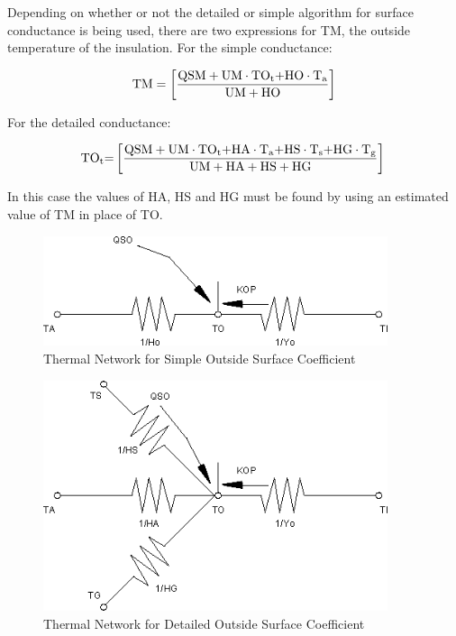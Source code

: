 Depending on whether or not the detailed or simple algorithm for surface conductance is being used, there are two expressions for TM, the outside temperature of the insulation. For the simple conductance:

\begin{equation}
{\rm{TM}} = \left[ {\frac{{{\rm{QSM + UM}}\cdot {\rm{T}}{{\rm{O}}_{\rm{t}}}{\rm{ + HO}}\cdot {{\rm{T}}_{\rm{a}}}}}{{{\rm{UM + HO}}}}} \right]
\end{equation}

For the detailed conductance:

\begin{equation}
{\rm{T}}{{\rm{O}}_{\rm{t}}}{\rm{ = }}\left[ {\frac{{{\rm{QSM}} + {\rm{UM}}\cdot {\rm{T}}{{\rm{O}}_{\rm{t}}}{\rm{ + HA}}\cdot {{\rm{T}}_{\rm{a}}}{\rm{ + HS}}\cdot {{\rm{T}}_{\rm{s}}}{\rm{ + HG}}\cdot {{\rm{T}}_{\rm{g}}}}}{{{\rm{UM + HA + HS + HG}}}}} \right]{\rm{  }}
\end{equation}

In this case the values of HA, HS and HG must be found by using an estimated value of TM in place of TO.

\begin{figure}[hbtp] %
\centering
\includegraphics[width=0.9\textwidth, height=0.9\textheight, keepaspectratio=true]{media/image420.png}
\caption{Thermal Network for Simple Outside Surface Coefficient \protect \label{fig:thermal-network-for-simple-outside-surface}}
\end{figure}

\begin{figure}[hbtp] %
\centering
\includegraphics[width=0.9\textwidth, height=0.9\textheight, keepaspectratio=true]{media/image421.png}
\caption{Thermal Network for Detailed Outside Surface Coefficient \protect \label{fig:thermal-network-for-detailed-outside-surface}}
\end{figure}

